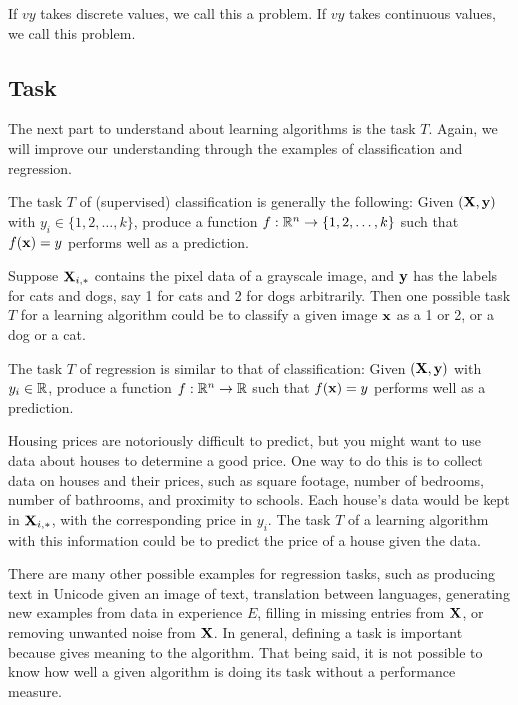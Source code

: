 \begin{definition}
If $vy$ takes discrete values, we call this a  problem. If $vy$ takes continuous values, we call this  problem. 
\end{definition}


\subsection{Task}

The next part to understand about learning algorithms is the task $T$. Again, we will improve our understanding through the examples of classification and regression.

The task $T$ of (supervised) classification is generally the following: Given $(\MX, \vy)$ with $y_i \in \{ 1, 2, \ldots, k \}$, produce a function $f: \R^n \to \{ 1, 2, \ldots, k \}$ such that $f(\vx) = y$ performs well as a prediction.

\begin{example}
Suppose $\MX_{i,\ast}$ contains the pixel data of a grayscale image, and $\vy$ has the labels for cats and dogs, say 1 for cats and 2 for dogs arbitrarily. Then one possible task $T$ for a learning algorithm could be to classify a given image $\vx$ as a 1 or 2, or a dog or a cat.
\end{example}

The task $T$ of regression is similar to that of classification: Given $(\MX, \vy)$ with $y_i \in \R$, produce a function $f: \R^n \to \R$ such that $f(\vx) = y$ performs well as a prediction.

\begin{example}
Housing prices are notoriously difficult to predict, but you might want to use data about houses to determine a good price. One way to do this is to collect data on houses and their prices, such as square footage, number of bedrooms, number of bathrooms, and proximity to schools. Each house's data would be kept in $\MX_{i,\ast}$, with the corresponding price in $y_i$. The task $T$ of a learning algorithm with this information could be to predict the price of a house given the data.
\end{example}

There are many other possible examples for regression tasks, such as producing text in Unicode given an image of text, translation between languages, generating new examples from data in experience $E$, filling in missing entries from $\MX$, or removing unwanted noise from $\MX$. In general, defining a task is important because gives meaning to the algorithm. That being said, it is not possible to know how well a given algorithm is doing its task without a performance measure.

